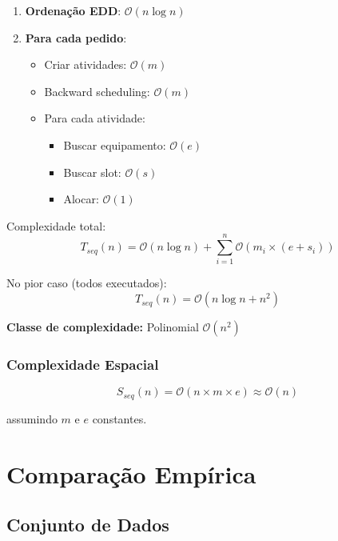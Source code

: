 \documentclass[12pt,a4paper]{article}
\theoremstyle{definition}
\newcommand{\BigO}{\mathcal{O}}
\begin{document}
\begin{enumerate}
    \item \textbf{Ordenação EDD}: $\BigO(n \log n)$
    \item \textbf{Para cada pedido}:
    \begin{itemize}
        \item Criar atividades: $\BigO(m)$
        \item Backward scheduling: $\BigO(m)$
        \item Para cada atividade:
        \begin{itemize}
            \item Buscar equipamento: $\BigO(e)$
            \item Buscar slot: $\BigO(s)$
            \item Alocar: $\BigO(1)$
        \end{itemize}
    \end{itemize}
\end{enumerate}

Complexidade total:
\begin{equation}
T_{seq}(n) = \BigO(n \log n) + \sum_{i=1}^{n} \BigO(m_i \times (e + s_i))
\end{equation}

No pior caso (todos executados):
\begin{equation}
T_{seq}(n) = \BigO(n \log n + n^2)
\end{equation}

\textbf{Classe de complexidade:} Polinomial $\BigO(n^2)$

\subsubsection{Complexidade Espacial}

\begin{equation}
S_{seq}(n) = \BigO(n \times m \times e) \approx \BigO(n)
\end{equation}

assumindo $m$ e $e$ constantes.

\section{Comparação Empírica}

\subsection{Conjunto de Dados}
\end{document}
